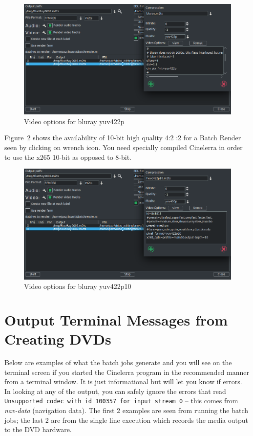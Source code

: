 \begin{figure}[htpb]
    \centering
    \includegraphics[width=0.7\linewidth]{images/dvd-batch03.png}
    \caption{Video options for bluray yuv422p}
    \label{fig:dvd-batch03}
\end{figure}

Figure~\ref{fig:dvd-batch04} shows the availability of 10-bit high quality 4:2 :2 for a Batch Render seen by clicking on wrench icon.  You need specially compiled Cinelerra in order to use the x265 10-bit as opposed to 8-bit.

\begin{figure}[htpb]
    \centering
    \includegraphics[width=0.7\linewidth]{images/dvd-batch04.png}
    \caption{Video options for bluray yuv422p10}
    \label{fig:dvd-batch04}
\end{figure}

\section{Output Terminal Messages from Creating DVDs}%
\label{sec:output_terminal_messages_dvd}

Below are examples of what the batch jobs generate and you will see on the terminal screen if you started the Cinelerra program in the recommended manner from a terminal window.  It is just informational but will let you know if errors.  In looking at any of the output, you can safely ignore the errors that read \texttt{Unsupported codec with id 100357 for input stream 0} -- this comes from \textit{nav-data} (navigation data).  The first 2 examples are seen from running the batch jobs; the last 2 are from the single line execution which records the media output to the DVD hardware.


